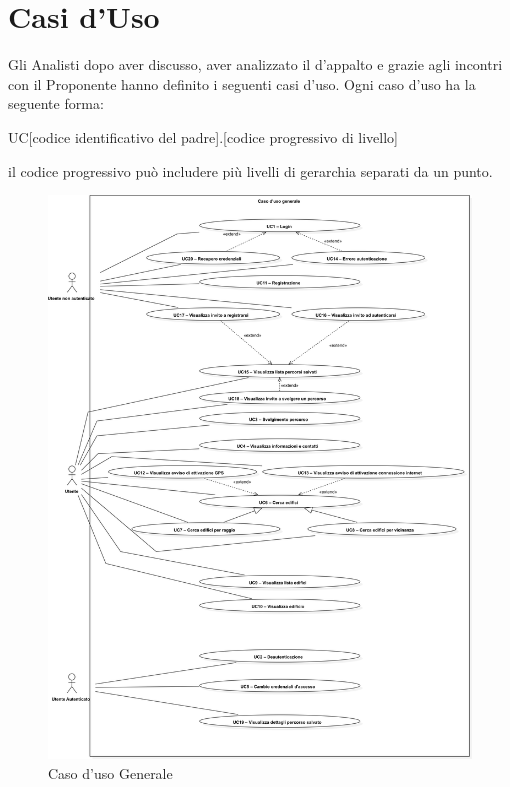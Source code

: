 \section{Casi d'Uso}
\label{sec:CasiUso}
Gli Analisti dopo aver discusso, aver analizzato il  d'appalto e grazie agli incontri con il Proponente hanno definito i seguenti casi d'uso.
Ogni caso d'uso ha la seguente forma:
\begin{center}
	UC[codice identificativo del padre].[codice progressivo di livello]
\end{center}
il codice progressivo può includere più livelli di gerarchia separati da un punto.

\begin{figure}[H]
\centering
\includegraphics[scale=0.12]{img/Generale.png}
\caption{Caso d'uso Generale}
\end{figure}
